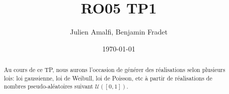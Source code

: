 \documentclass{article}
\title{RO05 TP1}
\author{Julien Amalfi, Benjamin Fradet}
\date{\today}
\begin{document}
\maketitle
\thispagestyle{fancy}


\begin{abstract}

    Au cours de ce TP, nous aurons l'occasion de générer des réalisations
    selon plusieurs lois: loi gaussienne, loi de Weibull, loi de Poisson, etc à
    partir de réalisations de nombres pseudo-aléatoires suivant
    $\mathcal{U}([0, 1])$.

\end{abstract}

\end{document}
